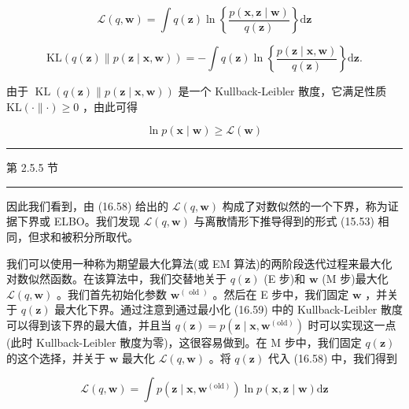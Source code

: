 \documentclass[10pt]{report}
\newcommand{\HRule}{\begin{center}\rule{0.9\linewidth}{0.2mm}\end{center}}
\begin{document}
\[
\mathcal{L}\left( {q,\mathbf{w}}\right)  = \int q\left( \mathbf{z}\right) \ln \left\{  \frac{p\left( {\mathbf{x},\mathbf{z} \mid  \mathbf{w}}\right) }{q\left( \mathbf{z}\right) }\right\}  \mathrm{d}\mathbf{z} \tag{16.58}
\]

\[
\mathrm{{KL}}\left( {q\left( \mathbf{z}\right) \parallel p\left( {\mathbf{z} \mid  \mathbf{x},\mathbf{w}}\right) }\right)  =  - \int q\left( \mathbf{z}\right) \ln \left\{  \frac{p\left( {\mathbf{z} \mid  \mathbf{x},\mathbf{w}}\right) }{q\left( \mathbf{z}\right) }\right\}  \mathrm{d}\mathbf{z}. \tag{16.59}
\]

由于 \(\operatorname{KL}\left( {q\left( \mathbf{z}\right) \parallel p\left( {\mathbf{z} \mid  \mathbf{x},\mathbf{w}}\right) }\right)\) 是一个 Kullback-Leibler 散度，它满足性质 \(\mathrm{{KL}}\left( {\cdot \parallel  \cdot  }\right)  \geq  0\) ，由此可得

\[
\ln p\left( {\mathbf{x} \mid  \mathbf{w}}\right)  \geq  \mathcal{L}\left( \mathbf{w}\right)  \tag{16.60}
\]

\HRule

第 2.5.5 节

\HRule

因此我们看到，由 (16.58) 给出的 \(\mathcal{L}\left( {q,\mathbf{w}}\right)\) 构成了对数似然的一个下界，称为证据下界或 ELBO。我们发现 \(\mathcal{L}\left( {q,\mathbf{w}}\right)\) 与离散情形下推导得到的形式 (15.53) 相同，但求和被积分所取代。

我们可以使用一种称为期望最大化算法(或 EM 算法)的两阶段迭代过程来最大化对数似然函数。在该算法中，我们交替地关于 \(q\left( \mathbf{z}\right)\) (E 步)和 \(\mathbf{w}\) (M 步)最大化 \(\mathcal{L}\left( {q,\mathbf{w}}\right)\) 。我们首先初始化参数 \({\mathbf{w}}^{\left( \text{ old }\right) }\) 。然后在 E 步中，我们固定 \(\mathbf{w}\) ，并关于 \(q\left( \mathbf{z}\right)\) 最大化下界。通过注意到通过最小化 (16.59) 中的 Kullback-Leibler 散度可以得到该下界的最大值，并且当 \(q\left( \mathbf{z}\right)  = p\left( {\mathbf{z} \mid  \mathbf{x},{\mathbf{w}}^{\left( \mathrm{{old}}\right) }}\right)\) 时可以实现这一点(此时 Kullback-Leibler 散度为零)，这很容易做到。在 M 步中，我们固定 \(q\left( \mathbf{z}\right)\) 的这个选择，并关于 \(\mathbf{w}\) 最大化 \(\mathcal{L}\left( {q,\mathbf{w}}\right)\) 。将 \(q\left( \mathbf{z}\right)\) 代入 (16.58) 中，我们得到

\[
\mathcal{L}\left( {q,\mathbf{w}}\right)  = \int p\left( {\mathbf{z} \mid  \mathbf{x},{\mathbf{w}}^{\left( \mathrm{{old}}\right) }}\right) \ln p\left( {\mathbf{x},\mathbf{z} \mid  \mathbf{w}}\right) \mathrm{d}\mathbf{z}
\]
\end{document}
